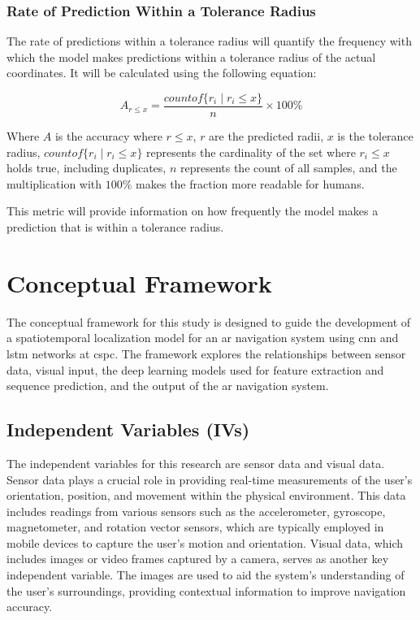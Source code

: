 \begin{refsection}
\subsubsection{Rate of Prediction Within a Tolerance Radius}

The rate of predictions within a tolerance radius will quantify the frequency with which the model makes predictions within a tolerance radius of the actual coordinates. It will be calculated using the following equation:

\begin{equation}
A_{r \leq x} = \frac{countof\{r_i \mid r_i \leq x\}}{n} \times 100\%
\label{eq:acc}
\end{equation}

Where \(A\) is the accuracy where \(r \leq x\), \(r\) are the predicted radii, \(x\) is the tolerance radius, \(countof\{r_i \mid r_i \leq x\}\) represents the cardinality of the set where \(r_i \leq x\) holds true, including duplicates, \(n\) represents the count of all samples, and the multiplication with \(100\%\) makes the fraction more readable for humans.

This metric will provide information on how frequently the model makes a prediction that is within a tolerance radius.

\section{Conceptual Framework}

The conceptual framework for this study is designed to guide the development of a spatiotemporal localization model for an \gls{ar} navigation system using \gls{cnn} and \gls{lstm} networks at \gls{cspc}. The framework explores the relationships between sensor data, visual input, the deep learning models used for feature extraction and sequence prediction, and the output of the \gls{ar} navigation system.

\subsection{Independent Variables (IVs)}

The independent variables for this research are sensor data and visual data. Sensor data plays a crucial role in providing real-time measurements of the user's orientation, position, and movement within the physical environment. This data includes readings from various sensors such as the accelerometer, gyroscope, magnetometer, and rotation vector sensors, which are typically employed in mobile devices to capture the user’s motion and orientation.
Visual data, which includes images or video frames captured by a camera, serves as another key independent variable. The images are used to aid the system’s understanding of the user's surroundings, providing contextual information to improve navigation accuracy.


\end{refsection}
